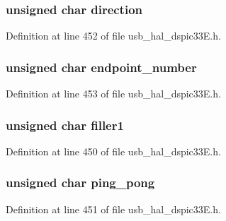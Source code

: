 \subsubsection[{direction}]{\setlength{\rightskip}{0pt plus 5cm}unsigned char direction}\label{union_____u_s_t_a_t_a4c9b82152ef06a9d3b78f60779cd4b85}


Definition at line 452 of file usb\+\_\+hal\+\_\+dspic33\+E.\+h.

\hypertarget{union_____u_s_t_a_t_a4f411fec039d172f03e2a41d46ff58ca}{}
\subsubsection[{endpoint\+\_\+number}]{\setlength{\rightskip}{0pt plus 5cm}unsigned char endpoint\+\_\+number}\label{union_____u_s_t_a_t_a4f411fec039d172f03e2a41d46ff58ca}


Definition at line 453 of file usb\+\_\+hal\+\_\+dspic33\+E.\+h.

\hypertarget{union_____u_s_t_a_t_a54acb45d462e0ff47705a7514916273d}{}
\subsubsection[{filler1}]{\setlength{\rightskip}{0pt plus 5cm}unsigned char filler1}\label{union_____u_s_t_a_t_a54acb45d462e0ff47705a7514916273d}


Definition at line 450 of file usb\+\_\+hal\+\_\+dspic33\+E.\+h.

\hypertarget{union_____u_s_t_a_t_a9ec468b66f0444dc9be4ec11f75a0a5f}{}
\subsubsection[{ping\+\_\+pong}]{\setlength{\rightskip}{0pt plus 5cm}unsigned char ping\+\_\+pong}\label{union_____u_s_t_a_t_a9ec468b66f0444dc9be4ec11f75a0a5f}


Definition at line 451 of file usb\+\_\+hal\+\_\+dspic33\+E.\+h.

